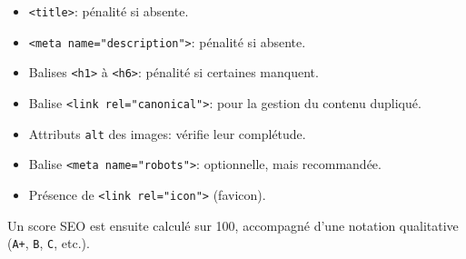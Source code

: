 \begin{justify}
\begin{enumerate}[label=\alph*)]
\begin{itemize}[label=$\bullet$]
            \begin{itemize}[label=$\bullet$]
                \item \texttt{<title>}: pénalité si absente.
                \item \texttt{<meta name="description">}: pénalité si absente.
                \item Balises \texttt{<h1>} à \texttt{<h6>}: pénalité si certaines manquent.
                \item Balise \texttt{<link rel="canonical">}: pour la gestion du contenu dupliqué.
                \item Attributs \texttt{alt} des images: vérifie leur complétude.
                \item Balise \texttt{<meta name="robots">}: optionnelle, mais recommandée.
                \item Présence de \texttt{<link rel="icon">} (favicon).
            \end{itemize}
        \end{itemize}
        
        Un score SEO est ensuite calculé sur 100, accompagné d’une notation qualitative (\texttt{A+}, \texttt{B}, \texttt{C}, etc.).
        

\end{enumerate}
\end{justify}
